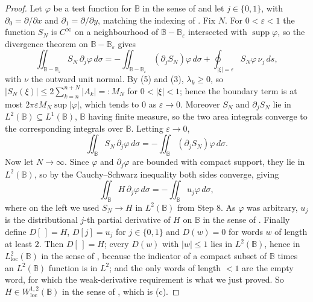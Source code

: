 \begin{proof}
Let $\varphi$ be a test function for $\mathbb{B}$ in the sense of
 and let $j\in\{0,1\}$, with $\partial_0=\partial/\partial x$
and $\partial_1=\partial/\partial y$, matching the indexing of
.  Fix $N$.  For $0<\varepsilon<1$ the function $S_N$ is
$C^\infty$ on a neighbourhood of $\overline{\mathbb{B}}-\mathbb{B}_\varepsilon$
intersected with $\operatorname{supp}\varphi$, so the divergence theorem on
$\mathbb{B}-\mathbb{B}_\varepsilon$ gives
\[
  \iint_{\mathbb{B}-\mathbb{B}_\varepsilon}S_N\,\partial_j\varphi\,d\sigma
  =-\iint_{\mathbb{B}-\mathbb{B}_\varepsilon}(\partial_jS_N)\varphi\,d\sigma
    +\oint_{|\xi|=\varepsilon}S_N\varphi\,\nu_j\,ds,
\]
with $\nu$ the outward unit normal.  By (5) and (3), $\lambda_k\ge0$, so
$|S_N(\xi)|\le2\sum_{k=n}^{n+N}|A_k|=:M_N$ for $0<|\xi|<1$; hence the boundary
term is at most $2\pi\varepsilon M_N\sup|\varphi|$, which tends to $0$ as
$\varepsilon\to0$.  Moreover $S_N$ and $\partial_jS_N$ lie in
$L^2(\mathbb{B})\subseteq L^1(\mathbb{B})$, $\mathbb{B}$ having finite measure,
so the two area integrals converge to the corresponding integrals over
$\mathbb{B}$.  Letting $\varepsilon\to0$,
\[
  \iint_{\mathbb{B}}S_N\,\partial_j\varphi\,d\sigma
  =-\iint_{\mathbb{B}}(\partial_jS_N)\varphi\,d\sigma .
\]
Now let $N\to\infty$.  Since $\varphi$ and $\partial_j\varphi$ are bounded with
compact support, they lie in $L^2(\mathbb{B})$, so by the Cauchy--Schwarz
inequality both sides converge, giving
\[
  \iint_{\mathbb{B}}H\,\partial_j\varphi\,d\sigma
  =-\iint_{\mathbb{B}}u_j\varphi\,d\sigma ,
\]
where on the left we used $S_N\to H$ in $L^2(\mathbb{B})$ from Step 8.  As
$\varphi$ was arbitrary, $u_j$ is the distributional $j$-th partial derivative
of $H$ on $\mathbb{B}$ in the sense of .  Finally
define $D[\,]=H$, $D[j]=u_j$ for $j\in\{0,1\}$ and $D(w)=0$ for words $w$ of
length at least $2$.  Then $D[\,]=H$; every $D(w)$ with $|w|\le1$ lies in
$L^2(\mathbb{B})$, hence in $L^2_{\mathrm{loc}}(\mathbb{B})$ in the sense of
, because the indicator of a compact subset of
$\mathbb{B}$ times an $L^2(\mathbb{B})$ function is in $L^2$; and the only
words of length $<1$ are the empty word, for which the weak-derivative
requirement is what we just proved.  So $H\in W^{1,2}_{\mathrm{loc}}(\mathbb{B})$
in the sense of , which is (c).


\end{proof}
